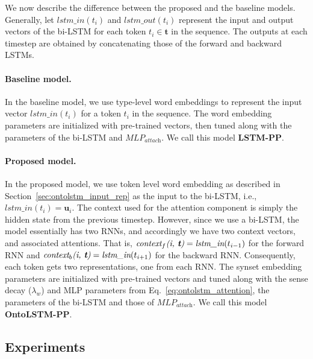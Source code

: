 We now describe the difference between the proposed and the baseline models.
Generally, let $\textit{lstm\_in}(t_i)$ and $\textit{lstm\_out}(t_i)$ represent
the input and output vectors of the bi-LSTM for each token $t_i \in
\boldsymbol{t}$ in the sequence. The outputs at each timestep are obtained by
concatenating those of the forward and backward LSTMs.

\paragraph{Baseline model.}
In the baseline model, we use type-level word embeddings to represent the input
vector $\textit{lstm\_in}(t_i)$ for a token $t_i$ in the sequence. The word
embedding parameters are initialized with pre-trained vectors, then tuned along
with the parameters of the bi-LSTM and $\textit{MLP}_{\textit{attach}}$. We call
this model \textbf{LSTM-PP}.

\paragraph{Proposed model.} \label{sec:ontolstm_proposed_ppa_model} In the
proposed model, we use token level word embedding as described in
Section~\ref{sec:ontolstm_input_rep} as the input to the bi-LSTM, i.e.,
$\textit{lstm\_in}(t_i) = \mathbf{u}_i$. The context used for the attention
component is simply the hidden state from the previous timestep. However, since
we use a bi-LSTM, the model essentially has two RNNs, and accordingly we have
two context vectors, and associated attentions. That is,
$\textit{context}_f\textit{(i, \textbf{t})} = \textit{lstm\_in}(t_{i-1})$ for
the forward RNN and $\textit{context}_b\textit{(i, \textbf{t})} =
\textit{lstm\_in}(t_{i+1})$ for the backward RNN\@. Consequently, each token
gets two representations, one from each RNN\@. The synset embedding parameters
are initialized with pre-trained vectors and tuned along with the sense decay
($\lambda_{w}$) and MLP parameters from Eq.~\ref{eq:ontolstm_attention}, the
parameters of the bi-LSTM and those of $\textit{MLP}_{\textit{attach}}$. We call
this model \textbf{OntoLSTM-PP}.

\subsection{Experiments} \label{sec:ontolstm_pp_experiments} 

